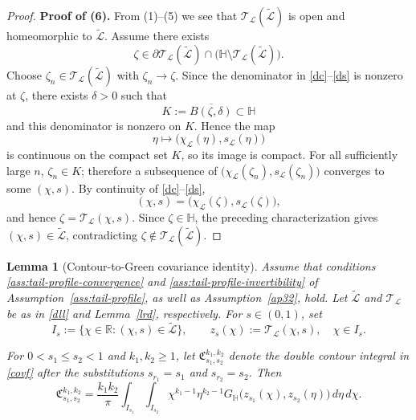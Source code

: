 \documentclass[11pt]{amsart}
\theoremstyle{plain}
\newtheorem{lemma}[theorem]{Lemma}
\newcommand\HH{{\mathbb H}}
\numberwithin{equation}{section}
\numberwithin{theorem}{section}
\numberwithin{figure}{section}
\begin{document}
\begin{proof}
\bigskip
\noindent\textbf{Proof of (6).} From (1)--(5) we see that $\mathcal T_{\mathcal L}(\widetilde{\mathcal{L}})$ is open and homeomorphic to $\widetilde{\mathcal{L}}$. Assume there exists
\[
\zeta\in\partial \mathcal T_{\mathcal L}(\widetilde{\mathcal{L}})
\cap\bigl(\HH\setminus \mathcal T_{\mathcal L}(\widetilde{\mathcal{L}})\bigr).
\]
Choose $\zeta_n\in \mathcal T_{\mathcal L}(\widetilde{\mathcal{L}})$ with $\zeta_n\to\zeta$. Since the denominator in \eqref{dc}--\eqref{ds} is nonzero at $\zeta$, there exists $\delta>0$ such that
\[
K:=\overline{B(\zeta,\delta)}\subset\HH
\]
and this denominator is nonzero on $K$. Hence the map
\[
\eta\longmapsto
\bigl(\chi_{\mathcal{L}}(\eta),s_{\mathcal{L}}(\eta)\bigr)
\]
is continuous on the compact set $K$, so its image is compact. For all sufficiently large $n$, $\zeta_n\in K$; therefore a subsequence of
$\bigl(\chi_{\mathcal{L}}(\zeta_n),s_{\mathcal{L}}(\zeta_n)\bigr)$ converges to some $(\chi,s)$. By continuity of \eqref{dc}--\eqref{ds},
\[
(\chi,s)=\bigl(\chi_{\mathcal{L}}(\zeta),s_{\mathcal{L}}(\zeta)\bigr),
\]
and hence $\zeta=\mathcal T_{\mathcal L}(\chi,s)$. Since $\zeta\in\HH$, the preceding characterization gives $(\chi,s)\in\widetilde{\mathcal{L}}$, contradicting $\zeta\notin \mathcal T_{\mathcal L}(\widetilde{\mathcal{L}})$.
\end{proof}

\begingroup

\begin{lemma}[Contour-to-Green covariance identity]
\label{lem:contour-to-green}
Assume that conditions
\ref{ass:tail-profile-convergence} and
\ref{ass:tail-profile-invertibility} of
Assumption~\ref{ass:tail-profile}, as well as
Assumption~\ref{ap32}, hold. Let
\(\widetilde{\mathcal L}\) and
\(\mathcal T_{\mathcal L}\) be as in
\eqref{dll} and Lemma~\ref{lrd}, respectively. For \(s\in(0,1)\), set
\[
    I_s
    :=
    \{\chi\in\mathbb R:(\chi,s)\in\widetilde{\mathcal L}\},
    \qquad
    z_s(\chi)
    :=
    \mathcal T_{\mathcal L}(\chi,s),
    \quad \chi\in I_s.
\]

For \(0<s_1\leq s_2<1\) and \(k_1,k_2\geq1\), let
\(\mathfrak C_{s_1,s_2}^{k_1,k_2}\) denote the double contour integral
in \eqref{covf} after the substitutions
\(s_{r_1}=s_1\) and \(s_{r_2}=s_2\). Then
\begin{equation}
    \mathfrak C_{s_1,s_2}^{k_1,k_2}
    =
    \frac{k_1k_2}{\pi}
    \int_{I_{s_1}}\int_{I_{s_2}}
    \chi^{k_1-1}\eta^{k_2-1}
    G_{\mathbb H}
    \bigl(z_{s_1}(\chi),z_{s_2}(\eta)\bigr)
    \,d\eta\,d\chi.
    \label{eq:contour-to-green}
\end{equation}
\end{lemma}
\end{document}
